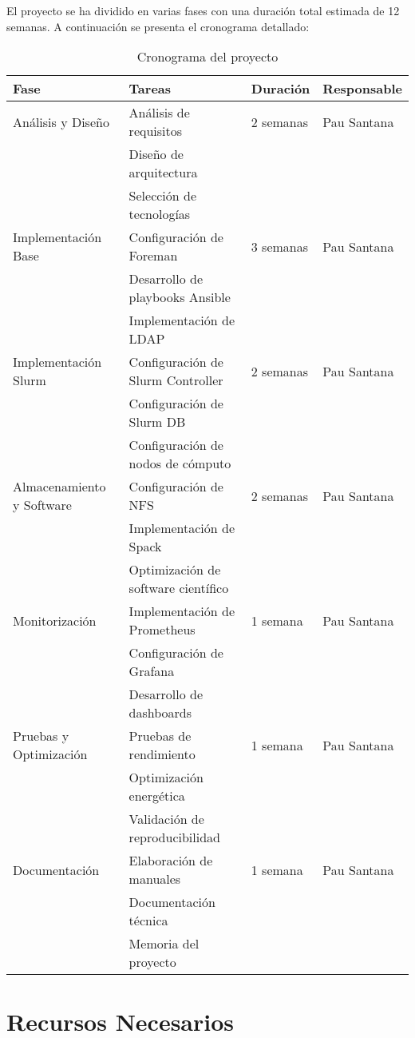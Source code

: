 \documentclass[12pt,a4paper]{report}
\begin{document}
El proyecto se ha dividido en varias fases con una duración total estimada de 12 semanas. A continuación se presenta el cronograma detallado:

\begin{table}[H]
\centering
\begin{tabular}{|l|l|l|l|}
\hline
\textbf{Fase} & \textbf{Tareas} & \textbf{Duración} & \textbf{Responsable} \\
\hline
Análisis y Diseño & Análisis de requisitos & 2 semanas & Pau Santana \\
 & Diseño de arquitectura & & \\
 & Selección de tecnologías & & \\
\hline
Implementación Base & Configuración de Foreman & 3 semanas & Pau Santana \\
 & Desarrollo de playbooks Ansible & & \\
 & Implementación de LDAP & & \\
\hline
Implementación Slurm & Configuración de Slurm Controller & 2 semanas & Pau Santana \\
 & Configuración de Slurm DB & & \\
 & Configuración de nodos de cómputo & & \\
\hline
Almacenamiento y Software & Configuración de NFS & 2 semanas & Pau Santana \\
 & Implementación de Spack & & \\
 & Optimización de software científico & & \\
\hline
Monitorización & Implementación de Prometheus & 1 semana & Pau Santana \\
 & Configuración de Grafana & & \\
 & Desarrollo de dashboards & & \\
\hline
Pruebas y Optimización & Pruebas de rendimiento & 1 semana & Pau Santana \\
 & Optimización energética & & \\
 & Validación de reproducibilidad & & \\
\hline
Documentación & Elaboración de manuales & 1 semana & Pau Santana \\
 & Documentación técnica & & \\
 & Memoria del proyecto & & \\
\hline
\end{tabular}
\caption{Cronograma del proyecto}
\label{tab:cronograma}
\end{table}

\section{Recursos Necesarios}
\end{document}
